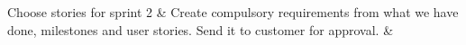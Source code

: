 \nextItem Choose stories for sprint 2 &
\nextItem Create compulsory requirements from what we have done, milestones and user stories. Send it to customer for approval. & 
